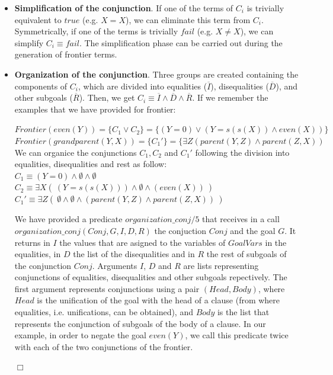 \documentclass{tlp}
\newcommand{\implementation}[1]{\noindent{\sc Implementation details:}
  #1 $\Box$}
\begin{document}
\begin{itemize}

\item {\bf Simplification of the conjunction}. If one of the terms of
$C_i$ is trivially equivalent to $true$ (e.g. $X=X$), we can eliminate
this term from $C_i$. Symmetrically, if one of the terms is trivially
$fail$ (e.g. $X \neq X$), we can simplify $C_i \equiv fail$. The
simplification phase can be carried out during the generation of
frontier terms.

\item {\bf Organization of the conjunction}. Three groups are created
containing the components of $C_i$, which are divided into equalities
($\overline{I}$), disequalities ($\overline{D}$), and other subgoals
($\overline{R}$).  Then, we get $C_i \equiv \overline{I} \wedge
\overline{D} \wedge \overline{R}$. If we remember the examples that we have
provided for frontier:

$Frontier(even(Y)) = \{ C_1  \vee  C_2 \} = \{ ( Y=0 ) \vee ( Y=s(s(X)) \wedge
even(X) ) \}$ \\
$Frontier(grandparent(Y,X)) = \{ C_1'\} =   \{ \exists Z (parent(Y,Z) \wedge
parent(Z,X) )$ \\

We can organice the conjunctions $C_1, C_2$ and $C_1'$ following the division
into equalities, disequalities and rest as follow:\\
$C_1 \equiv ( Y=0 )  \wedge  \emptyset \wedge \emptyset$ \\
$C_2 \equiv  \exists X (~( Y=s(s(X)) ) \wedge \emptyset \wedge ( even(X) )~ )$ \\
$C_1' \equiv \exists Z (~ \emptyset \wedge \emptyset \wedge ( parent(Y,Z) \wedge
parent(Z,X)  ) ~)$ \\


\implementation{
We have provided a predicate $organization\_conj/5$ 
that receives in a call $organization\_conj(Conj,G,I,D,R)$ the conjuction
$Conj$ and the goal $G$. It returns in $I$ the values that are asigned to the
variables of $GoalVars$ in the equalities, in $D$ the list of the
disequalities and in $R$ the rest of subgoals of the conjunction
$Conj$. Arguments $I$, $D$ and $R$ are lists representing conjunctions of
equalities, disequalities and other subgoals repectively. The first argument
represents conjunctions using a pair $(Head,Body)$, where $Head$ is the
unification of the goal with the head of a clause (from where equalities, i.e.
unifications, can
be obtained), and $Body$ is the list that represents the conjunction of
subgoals of the body of a clause. 
In our example, in order to negate the  goal $even(Y)$, we call this predicate twice with
each of the two conjunctions of the frontier. 

}
\end{itemize}
\end{document}
